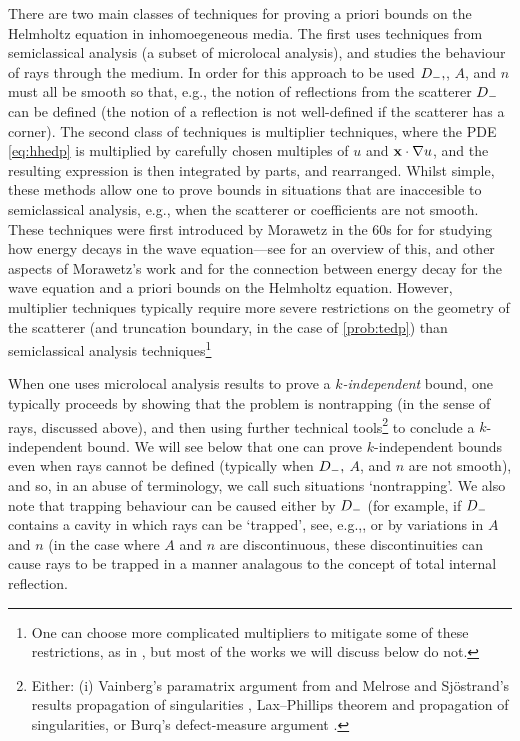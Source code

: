     There are two main classes of techniques for proving a priori bounds on the Helmholtz equation in inhomoegeneous media. The first uses techniques from semiclassical analysis (a subset of microlocal analysis), and studies the behaviour of rays through the medium. In order for this approach to be used $D_{-},$, $A$, and $n$ must all be smooth so that, e.g., the notion of reflections from the scatterer $D_{-}$ can be defined (the notion of a reflection is not well-defined if the scatterer has a corner). The second class of techniques is multiplier techniques, where the PDE \eqref{eq:hhedp} is multiplied by carefully chosen multiples of $u$ and $\mathbf{x}\cdot\nabla u$, and the resulting expression is then integrated by parts, and rearranged. Whilst simple, these methods allow one to prove bounds in situations that are inaccesible to semiclassical analysis, e.g., when the scatterer or coefficients are not smooth. These techniques were first introduced by Morawetz in the 60s for for studying how energy decays in the wave equation---see \cite{GaGrPaSaSoTa:18} for an overview of this, and other aspects of Morawetz's work and for the connection between energy decay for the wave equation and a priori bounds on the Helmholtz equation. However, multiplier techniques typically require more severe restrictions on the geometry of the scatterer (and truncation boundary, in the case of \cref{prob:tedp}) than semiclassical analysis techniques\footnote{One can choose more complicated multipliers to mitigate some of these restrictions, as in \cite{MoRaSt:77}, but most of the works we will discuss below do not.}

When one uses microlocal analysis results to prove a \emph{$k$-independent} bound, one typically proceeds by showing that the problem is nontrapping (in the sense of rays, discussed above), and then using further technical tools\footnote{Either: (i) Vainberg's paramatrix argument from \cite{Va:75} and Melrose and Sj\"ostrand's results propagation of singularities \cite{MeSj:82}, Lax--Phillips theorem \cite{LaPh:??} and propagation of singularities, or Burq's defect-measure argument \cite{Bu:02}.} to conclude a $k$-independent bound. We will see below that one can prove $k$-independent bounds even when rays cannot be defined (typically when $D_{-},$ $A$, and $n$ are not smooth), and so, in an abuse of terminology, we call such situations `nontrapping'. We also note that trapping behaviour can be caused either by $D_{-}$ (for example, if $D_{-}$ contains a cavity in which rays can be `trapped', see, e.g.,, or by variations in $A$ and $n$ (in the case where $A$ and $n$ are discontinuous, these discontinuities can cause rays to be trapped in a manner analagous to the concept of total internal reflection.

